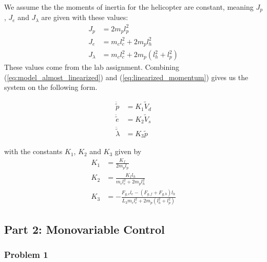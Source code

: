 We assume the the moments of inertia for the helicopter are constant, meaning $J_p$, $J_e$ and $J_\lambda$ are given with these values:
\begin{subequations}
    \label{eq:linearized_momentum}
    \begin{align}
        J_p &= 2 m_p l_p ^2 \\
        J_e &= m_c l_c ^2 + 2 m_p l_h ^2 \\
        J_\lambda &= m_c l_c ^2 + 2 m_p (l_h ^2 + l_p ^2)
    \end{align}
\end{subequations}
These values come from the lab assignment. Combining (\ref{eq:model_almost_linearized}) and (\ref{eq:linearized_momentum}) gives us the system on the following form. 

\begin{subequations}\label{eq:model_linearized}
	\begin{align}
		\ddot{\tilde p} &= K_1 \tilde V_{d} \label{eq:model_linearized_pitch}\\
		\ddot{\tilde e} &= K_2 \tilde V_s \label{eq:model_linearized_elev}\\
		\ddot{\tilde \lambda} &= K_3 \tilde p \label{eq:model_linearized_lambda}
	\end{align}
\end{subequations}

with the constants $K_1$, $K_2$ and $K_3$ given by
\begin{subequations}
    \begin{align}
        K_1 &= \frac{K_f}{2 m_p l_p} \\
        K_2 &= \frac{K_f l_h}{m_c l_c ^2 + 2 m_p l_h ^2} \\
        K_3 &= -\frac{F_{g, c} l_c - (F_{g, f} + F_{g, b}) l_h}{L_3 m_c l_c ^2 + 2 m_p (l_h ^2 + l_p ^2)}
    \end{align}
\end{subequations}




\subsection{Part 2: Monovariable Control}
\subsubsection{Problem 1}

